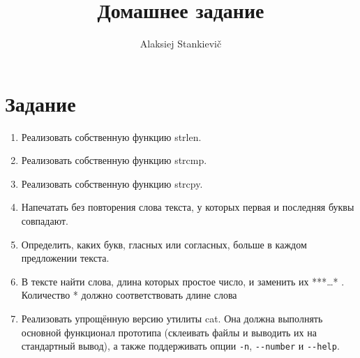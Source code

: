 \documentclass[12pt]{article}
\author{Alaksiej Stankievič}
\title{Домашнее задание}
\begin{document}

\section{Задание}


\begin{enumerate}
 \item Реализовать собственную функцию strlen.
 \item Реализовать собственную функцию strcmp.
 \item Реализовать собственную функцию strcpy.
 \item Напечатать без повторения слова текста, у которых первая и последняя буквы совпадают.
 \item Определить, каких букв, гласных или согласных, больше в каждом предложении текста.
 \item В тексте найти слова, длина которых  простое число, и заменить их  ***…* .  Количество  *  должно соответствовать
длине слова
 \item Реализовать упрощённую версию утилиты cat. Она должна выполнять основной функционал прототипа (склеивать файлы и
 выводить их на стандартный вывод), а также поддерживать опции \verb|-n|, \verb|--number| и \verb|--help|.
 \end{enumerate}
\end{document}

